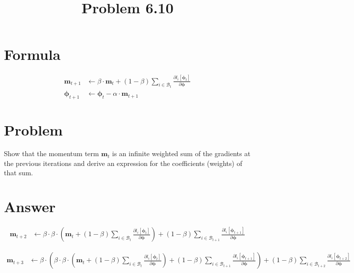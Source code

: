 \documentclass{article}
\title{Problem 6.10}
\begin{document}
\maketitle

\section{Formula}

\begin{align*}
    \boldsymbol{m}_{t+1} &\leftarrow \beta \cdot \boldsymbol{m}_{t} + (1 - \beta)\sum_{i \in \mathcal{B}_{t}}\frac{\partial{l_{i}[\boldsymbol{\phi}_{t}]}}{\partial{\boldsymbol{\phi}}}
    \\
    \boldsymbol{\phi}_{t+1} &\leftarrow \boldsymbol{\phi}_{t} - \alpha \cdot \boldsymbol{m}_{t+1}
\end{align*}

\section{Problem}

Show that the momentum term $\boldsymbol{m}_{t} $ is an infinite weighted sum of the gradients at the previous iterations and derive an expression for the coeﬀicients (weights) of that sum.

\section{Answer}

\begin{align*}
    \boldsymbol{m}_{t+2} &\leftarrow \beta \cdot
    \beta \cdot \left( \boldsymbol{m}_{t} + (1 - \beta)\sum_{i \in \mathcal{B}_{t}}
     \frac{\partial{l_{i}[\boldsymbol{\phi}_{t}]}}{\partial{\boldsymbol{\phi}}} \right)
     + (1 - \beta)\sum_{i \in \mathcal{B}_{t+1}}\frac{\partial{l_{i}[\boldsymbol{\phi}_{t+1}]}}{\partial{\boldsymbol{\phi}}}
\end{align*}

\begin{align*}
    \boldsymbol{m}_{t+3} &\leftarrow \beta \cdot 
    \left(
        \beta \cdot
        \beta \cdot \left( \boldsymbol{m}_{t} + (1 - \beta)\sum_{i \in \mathcal{B}_{t}}
         \frac{\partial{l_{i}[\boldsymbol{\phi}_{t}]}}{\partial{\boldsymbol{\phi}}} \right)
         + (1 - \beta)\sum_{i \in \mathcal{B}_{t+1}}\frac{\partial{l_{i}[\boldsymbol{\phi}_{t+1}]}}{\partial{\boldsymbol{\phi}}}
    \right) 
    + (1 - \beta)\sum_{i \in \mathcal{B}_{t+2}}\frac{\partial{l_{i}[\boldsymbol{\phi}_{t+2}]}}{\partial{\boldsymbol{\phi}}}
\end{align*}
\end{document}
